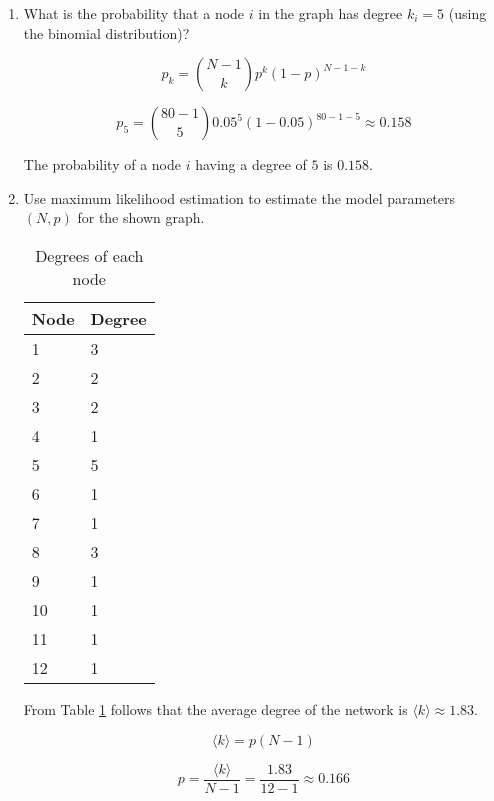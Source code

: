\begin{enumerate}
	\item What is the probability that a node $i$ in the graph has degree $k_i = 5$ (using the binomial distribution)?
	
	\begin{equation*}
		p_k = {N - 1 \choose k} p^k (1-p)^{N-1-k}
	\end{equation*}
	
	\begin{equation*}
		p_5 = {80 - 1 \choose 5} 0.05^5 (1-0.05)^{80-1-5} \approx 0.158
	\end{equation*}
	
	The probability of a node $i$ having a degree of $5$ is $0.158$.
	
	\item Use maximum likelihood estimation to estimate the model parameters $(N, p)$ for the shown graph.
	
	\begin{table}[]
	\centering
	\begin{tabular}{ll}
		\hline
		Node & Degree \\ \hline
		1    & 3      \\
		2    & 2      \\
		3    & 2      \\
		4    & 1      \\
		5    & 5      \\
		6    & 1      \\
		7    & 1      \\
		8    & 3      \\
		9    & 1      \\
		10   & 1      \\
		11   & 1      \\
		12   & 1      \\ \hline
	\end{tabular}
	\caption{Degrees of each node}
	\label{tab:node_degrees}
	\end{table}

	From Table \ref{tab:node_degrees} follows that the average degree of the network is $\langle k \rangle \approx 1.83$.
	
	\begin{equation*}
		\langle k \rangle = p(N-1)
	\end{equation*}
	
	\begin{equation*}
		p = \frac{\langle k \rangle}{N-1} = \frac{1.83}{12-1} \approx 0.166
	\end{equation*}
	

\end{enumerate}
